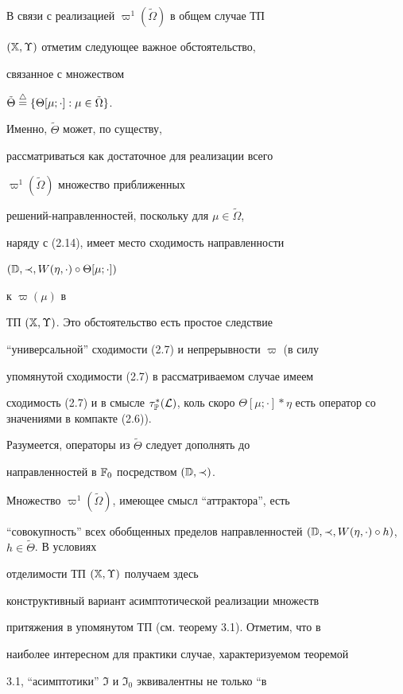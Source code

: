 В связи с реализацией $\varpi^1(\tilde\Omega)$ в общем случае ТП


$({\Bbb X}, \Upsilon)$ отметим следующее важное обстоятельство,


связанное с множеством 


$\tilde\Theta \overset{\triangle}{=} \{\Theta[\mu; \cdot]: \mu \in \tilde\Omega\}$. 


Именно, $\tilde\Theta$ может, по существу,


рассматриваться как достаточное для реализации всего


$\varpi^1(\tilde\Omega)$ множество приближенных


решений-направленностей, поскольку для $\mu \in \tilde\Omega$,


наряду с (2.14), имеет место сходимость направленности 


$({\Bbb D},\prec, W(\eta, \cdot) \circ \Theta[\mu; \cdot])$


к $\varpi(\mu)$ в


ТП $({\Bbb X}, \Upsilon)$. Это обстоятельство есть простое следствие


``универсальной'' сходимости (2.7) и непрерывности $\varpi$ (в силу


упомянутой сходимости (2.7) в рассматриваемом случае имеем


сходимость (2.7) и в смысле $\tap$, коль скоро $\Theta[\mu;


\cdot]\ast\eta$ есть оператор со значениями в компакте (2.6)).


Разумеется, операторы из $\tilde\Theta$ следует дополнять до


направленностей в ${\Bbb F}_0$ посредством $({\Bbb D}, \prec)$.


Множество $\varpi^1(\tilde\Omega)$, имеющее смысл ``аттрактора'', есть


``совокупность'' всех обобщенных пределов направленностей $({\Bbb D},


\prec, W(\eta, \cdot) \circ h)$, $h \in \tilde\Theta$. В условиях


отделимости ТП $({\Bbb X}, \Upsilon)$ получаем здесь


конструктивный вариант асимптотической реализации множеств


притяжения в упомянутом ТП (см. теорему 3.1). Отметим, что в


наиболее интересном для практики случае, характеризуемом теоремой


3.1, ``асимптотики'' $\Im$ и $\Im_0$ эквивалентны не только ``в


